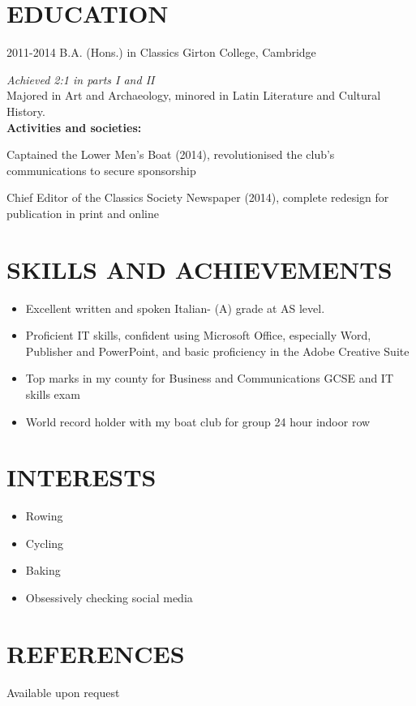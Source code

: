 \documentclass[]{friggeri-cv}
\begin{document}
\section{EDUCATION}

\begin{entrylist}
	\entry
	{2011-2014}
	{B.A. (Hons.) in Classics}
	{Girton College, Cambridge}
	{\emph{Achieved 2:1 in parts I and II}
	\\
	
	Majored in Art and Archaeology, minored in Latin Literature and Cultural History.
	\\
	
	\textbf{Activities and societies:} 
	
	Captained the Lower Men's Boat (2014), revolutionised the club's communications to secure sponsorship
	
	Chief Editor of the Classics Society Newspaper (2014), complete redesign for publication in print and online
	}
\end{entrylist}

\section{SKILLS AND ACHIEVEMENTS}

\begin{itemize}
	\item Excellent written and spoken Italian- (A) grade at AS level. 
	\item Proficient IT skills, confident using Microsoft Office, especially Word, Publisher and PowerPoint, and basic proficiency in the Adobe Creative Suite
	\item Top marks in my county for Business and Communications GCSE and IT skills exam 
	\item World record holder with my boat club for group 24 hour indoor row
\end{itemize}

\section{INTERESTS}

\begin{itemize}
	\item Rowing
	\item Cycling

	\item Baking
	\item Obsessively checking social media
\end{itemize}

\section{REFERENCES}

Available upon request
\end{document}
